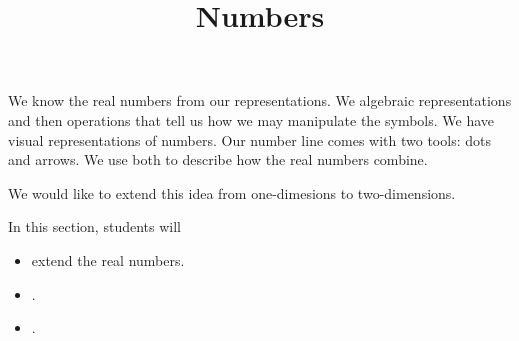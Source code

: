 \documentclass{ximera}
\title{Numbers}
\begin{document}
\begin{abstract}
\end{abstract}
\maketitle







We know the real numbers from our representations.  We algebraic representations and then operations that tell us how we may manipulate the symbols. We have visual representations of numbers.  Our number line comes with two tools: dots and arrows.  We use both to describe how the real numbers combine.

We would like to extend this idea from one-dimesions to two-dimensions.












\begin{sectionOutcomes}
In this section, students will 

\begin{itemize}
\item extend the real numbers.
\item .
\item .
\end{itemize}
\end{sectionOutcomes}
\end{document}
